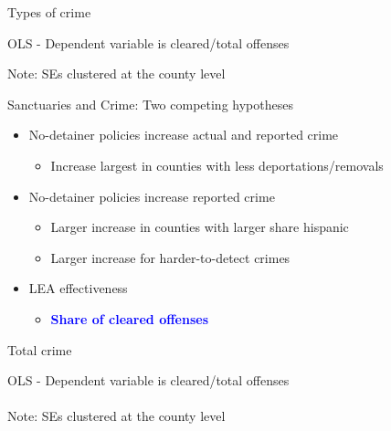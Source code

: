\documentclass[xcolor=pdftex,dvipsnames,table,handout]{beamer}
\newcommand{\tablesfolder}{/Users/bbiasi/Dropbox/Research/sanctuaries/sanctuaries_git/tex/tables}
\begin{document}
\begin{frame}{Types of crime}
\tiny
\begin{center}
\footnotesize{OLS - Dependent variable is cleared/total offenses}\\
\tiny

Note: SEs clustered at the county level
\end{center}
\end{frame}

\begin{frame}{Sanctuaries and Crime: Two competing hypotheses}
\begin{itemize}
\item No-detainer policies increase actual and reported crime\vspace{0.10cm}
\begin{itemize}
\item Increase largest in counties with less deportations/removals
\end{itemize}\vspace{0.30cm}
\item No-detainer policies increase reported crime\vspace{0.10cm}
\begin{itemize}
\item Larger increase in counties with larger share hispanic\vspace{0.10cm}
\item Larger increase for harder-to-detect crimes
\end{itemize}\vspace{0.30cm}
\item LEA effectiveness\vspace{0.10cm}
\begin{itemize}
\item \textbf{\textcolor{Blue}{Share of cleared offenses}}
\end{itemize}
\end{itemize}
\end{frame}

\begin{frame}{Total crime}
\footnotesize
\begin{center}
OLS - Dependent variable is cleared/total offenses\\

\\\footnotesize{Note: SEs clustered at the county level}
\end{center}
\end{frame}
\end{document}
